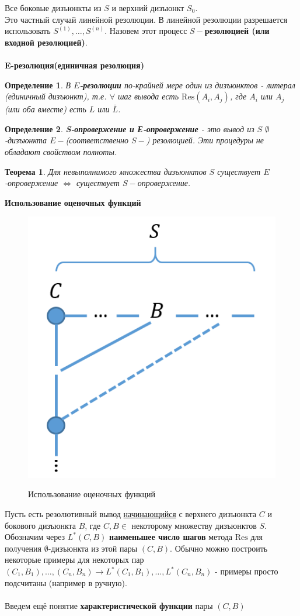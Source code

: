 \documentclass{article}
\newtheorem{theorem}{Теорема}
\newtheorem{definition}{Определение}
\numberwithin{example}{section}
\numberwithin{question}{section}
\numberwithin{Remark}{section}
\numberwithin{theorem}{section}
\numberwithin{definition}{section}
\numberwithin{proposition}{section}
\begin{document}
Все боковые дизъюнкты из $S$ и верхний дизъюнкт $S_0$.\\
Это частный случай линейной резолюции. В линейной резолюции разрешается использовать $S^{(1)},\ldots,S^{(n)}$. Назовем этот процесс \textbf{$S-$резолюцией (или входной резолюцией)}.\\
\\
\textbf{E-резолюция(единичная резолюция)}
\begin{definition}
	В \textbf{$E$-резолюции} по-крайней мере один из дизъюнктов - литерал (единичный дизъюнкт), т.е. $\forall$ шаг вывода есть $\mathrm{Res}(A_i,A_j)$, где $A_i$ или $A_j$ (или оба вместе) есть $L$ или $\bar{L}$.
\end{definition}
\begin{definition}
	\textbf{S-опровержение и Е-опровержение} - это вывод из $S$ $\emptyset$-дизъюнкта $E-$(соответственно $S-$) резолюцией. Эти процедуры не обладают свойством полноты.
\end{definition}
\begin{theorem}
	Для невыполнимого множества дизъюнктов $S$ существует $E$-опровержение $\Leftrightarrow$ существует $S-$опровержение.
\end{theorem}
\textbf{Использование оценочных функций}
\begin{figure}[!htbp]
	\centering
	\includegraphics[width=0.3\linewidth]{7-5}
	\label{fig:7-5}
	\caption{Использование оценочных функций}
\end{figure}
Пусть есть резолютивный вывод \underline{начинающийся} с верхнего дизъюнкта $C$ и бокового дизъюнкта $B$, где $C,B\in$ некоторому множеству дизъюнктов $S$. Обозначим через $L^*(C,B)$ \textbf{наименьшее число шагов} метода $\mathrm{Res}$ для получения $\emptyset$-дизъюнкта из этой пары $(C,B)$. Обычно можно построить некоторые примеры для некоторых пар $(C_1,B_1),\ldots,(C_n,B_n) \to L^*(C_1,B_1),\ldots,L^*(C_n,B_n)$ - примеры просто подсчитаны (например в ручную).\\
\\
Введем ещё понятие \textbf{характеристической функции} пары $(C,B)$\\
\end{document}
